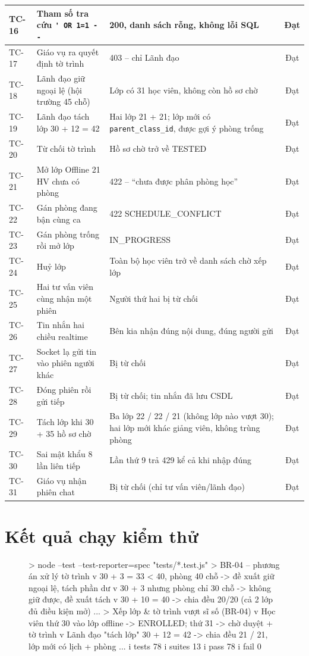 \begin{xltabular}{\linewidth}{|l|L{5.4cm}|Y|c|}
  TC-16 & Tham số tra cứu \verb|' OR 1=1 --| & 200, danh sách rỗng, không lỗi SQL & Đạt \\ \hline
  TC-17 & Giáo vụ ra quyết định tờ trình & 403 – chỉ Lãnh đạo & Đạt \\ \hline
  TC-18 & Lãnh đạo giữ ngoại lệ (hội trường 45 chỗ) & Lớp có 31 học viên, không còn hồ sơ chờ & Đạt \\ \hline
  TC-19 & Lãnh đạo tách lớp 30 + 12 = 42 & Hai lớp 21 + 21; lớp mới có \texttt{parent\_class\_id}, được gợi ý phòng trống & Đạt \\ \hline
  TC-20 & Từ chối tờ trình & Hồ sơ chờ trở về TESTED & Đạt \\ \hline
  TC-21 & Mở lớp Offline 21 HV chưa có phòng & 422 – “chưa được phân phòng học” & Đạt \\ \hline
  TC-22 & Gán phòng đang bận cùng ca & 422 SCHEDULE\_CONFLICT & Đạt \\ \hline
  TC-23 & Gán phòng trống rồi mở lớp & IN\_PROGRESS & Đạt \\ \hline
  TC-24 & Huỷ lớp & Toàn bộ học viên trở về danh sách chờ xếp lớp & Đạt \\ \hline
  TC-25 & Hai tư vấn viên cùng nhận một phiên & Người thứ hai bị từ chối & Đạt \\ \hline
  TC-26 & Tin nhắn hai chiều realtime & Bên kia nhận đúng nội dung, đúng người gửi & Đạt \\ \hline
  TC-27 & Socket lạ gửi tin vào phiên người khác & Bị từ chối & Đạt \\ \hline
  TC-28 & Đóng phiên rồi gửi tiếp & Bị từ chối; tin nhắn đã lưu CSDL & Đạt \\ \hline
  TC-29 & Tách lớp khi 30 + 35 hồ sơ chờ & Ba lớp 22 / 22 / 21 (không lớp nào vượt 30); hai lớp mới khác giảng viên, không trùng phòng & Đạt \\ \hline
  TC-30 & Sai mật khẩu 8 lần liên tiếp & Lần thứ 9 trả 429 kể cả khi nhập đúng & Đạt \\ \hline
  TC-31 & Giáo vụ nhận phiên chat & Bị từ chối (chỉ tư vấn viên/lãnh đạo) & Đạt \\ \hline
\end{xltabular}

\section{Kết quả chạy kiểm thử}
\begin{figure}[H]
\begin{PlainCode}
> node --test --test-reporter=spec "tests/*.test.js"
> BR-04 – phương án xử lý tờ trình
  v 30 + 3 = 33 < 40, phòng 40 chỗ -> đề xuất giữ ngoại lệ, tách phần dư
  v 30 + 3 nhưng phòng chỉ 30 chỗ -> không giữ được, đề xuất tách
  v 30 + 10 = 40 -> chia đều 20/20 (cả 2 lớp đủ điều kiện mở)
  ...
> Xếp lớp & tờ trình vượt sĩ số (BR-04)
  v Học viên thứ 30 vào lớp offline -> ENROLLED; thứ 31 -> chờ duyệt + tờ trình
  v Lãnh đạo "tách lớp" 30 + 12 = 42 -> chia đều 21 / 21, lớp mới có lịch + phòng
  ...
i tests 78
i suites 13
i pass 78
i fail 0
\end{PlainCode}
\label{lst:testout}
\end{figure}

